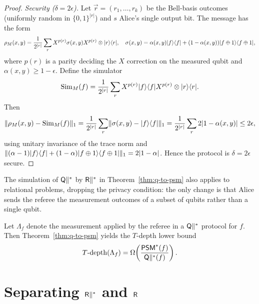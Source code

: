 \begin{proof}
  \emph{Security ($\delta = 2\epsilon$).} Let $\vec r = (r_1,\dots,r_k)$ be the
  Bell-basis outcomes (uniformly random in $\{0,1\}^{|r|}$) and $s$ Alice's single
  output bit. The message has the form
  \[
    \rho_M(x,y) = \frac{1}{2^{|r|}}\sum_r X^{p(r)}\sigma(x,y)X^{p(r)}\otimes
      \lvert r\rangle\langle r\rvert, \quad
    \sigma(x,y) = \alpha(x,y)\lvert f\rangle\langle f\rvert + (1-\alpha(x,y))\lvert f\oplus1\rangle\langle f\oplus1\rvert,
  \]
  where $p(r)$ is a parity deciding the $X$ correction on the measured qubit and
  $\alpha(x,y)\ge 1-\epsilon$. Define the simulator
  \[
    \mathrm{Sim}_M(f) = \frac{1}{2^{|r|}}\sum_r X^{p(r)}\lvert f\rangle\langle f\rvert X^{p(r)}\otimes
      \lvert r\rangle\langle r\rvert.
  \]
  Then
  \[
    \lVert \rho_M(x,y) - \mathrm{Sim}_M(f) \rVert_{1}
      = \frac{1}{2^{|r|}}\sum_r \lVert \sigma(x,y) - \lvert f\rangle\langle f\rvert \rVert_{1}
      = \frac{1}{2^{|r|}}\sum_r 2|1-\alpha(x,y)| \le 2\epsilon ,
  \]
  using unitary invariance of the trace norm and
  $\lVert (\alpha-1)\lvert f\rangle\langle f\rvert + (1-\alpha)\lvert f\oplus1\rangle\langle f\oplus1\rvert \rVert_{1} =
  2|1-\alpha|$. Hence the protocol is $\delta = 2\epsilon$ secure.
\end{proof}

\begin{proposition}
  \label{prop:relational-sim}
  \notready
  The simulation of $\mathsf{Q}\|^{*}$ by $\mathsf{R}\|^{*}$ in Theorem~\ref{thm:q-to-psm} also
  applies to relational problems, dropping the privacy condition: the only change
  is that Alice sends the referee the measurement outcomes of a subset of qubits
  rather than a single qubit.
\end{proposition}

\begin{proposition}
  \label{prop:tdepth-lb}
  \notready
  Let $\Lambda_f$ denote the measurement applied by the referee in a $\mathsf{Q}\|^{*}$
  protocol for $f$. Then Theorem~\ref{thm:q-to-psm} yields the $T$-depth lower
  bound
  \[
    T\text{-}\mathrm{depth}(\Lambda_f) = \Omega\!\left(
      \frac{\mathsf{PSM}^{*}(f)}{\mathsf{Q}\|^{*}(f)}\right).
  \]
\end{proposition}

\section{Separating $\mathsf{R}\|^{*}$ and $\mathsf{R}$}

